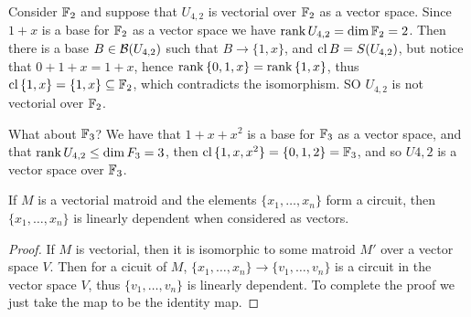 \begin{example}
    Consider $\mathbb{F}_2$ and suppose that $U_{4,2}$ is vectorial over $\mathbb{F}_2$ as a vector space. Since
    $1+x$ is a base for $\mathbb{F}_2$ as a vector space we have $\operatorname{rank}{U_{4,2}}=\dim{\mathbb{F}_2}=2$. Then there is a base $B \in
    \mathcal{B}(U_{4,2})$ such that $B \rightarrow \{1,x\}$, and $\operatorname{cl}{B}=S(U_{4,2})$, but notice that
    $0+1+x=1+x$, hence  $\operatorname{rank}{\{0,1,x\}}=\operatorname{rank}{\{1,x\}}$, thus $\operatorname{cl}{\{1,x\}}=\{1,x\} \subseteq
    \mathbb{F}_2$, which contradicts the isomorphism. SO $U_{4,2}$ is not vectorial over $\mathbb{F}_2$.

    What about $\mathbb{F}_3$? We have that $1+x+x^2$ is a base for $\mathbb{F}_3$ as a vector space, and that
    $\operatorname{rank}{U_{4,2}} \leq \dim{F_3}=3$, then $\operatorname{cl}{\{1,x,x^2\}}=\{0,1,2\}=\mathbb{F}_3$, and so $U{4,2}$ is a
    vector space over $\mathbb{F}_3$.
\end{example} 

\begin{proposition}\label{1.2.3}
    If $M$ is a vectorial matroid and the elements $\{x_1, \dots ,x_n\}$ form a circuit, then
    $\{x_1, \dots ,x_n\}$ is linearly dependent when considered as vectors. 
\end{proposition}
\begin{proof}
    If $M$ is vectorial, then it is isomorphic to some matroid  $M'$ over a vector space  $V$. Then
    for a cicuit of  $M$,  $\{x_1, \dots ,x_n\} \rightarrow \{v_1, \dots ,v_n\}$ is a circuit in the
    vector space $V$, thus  $\{v_1, \dots, v_n\}$ is linearly dependent. To complete the proof we
    just take the map to be the identity map.
\end{proof}

